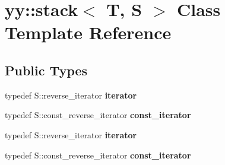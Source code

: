 \hypertarget{classyy_1_1stack}{}\section{yy\+:\+:stack$<$ T, S $>$ Class Template Reference}
\label{classyy_1_1stack}
\subsection*{Public Types}
\begin{DoxyCompactItemize}
\item 
\hypertarget{classyy_1_1stack_a959921144f243952520a2178121cbe6f}{}typedef S\+::reverse\+\_\+iterator {\bfseries iterator}\label{classyy_1_1stack_a959921144f243952520a2178121cbe6f}

\item 
\hypertarget{classyy_1_1stack_a0cab3a74b0947ce6de68c3520b9229ab}{}typedef S\+::const\+\_\+reverse\+\_\+iterator {\bfseries const\+\_\+iterator}\label{classyy_1_1stack_a0cab3a74b0947ce6de68c3520b9229ab}

\item 
\hypertarget{classyy_1_1stack_a959921144f243952520a2178121cbe6f}{}typedef S\+::reverse\+\_\+iterator {\bfseries iterator}\label{classyy_1_1stack_a959921144f243952520a2178121cbe6f}

\item 
\hypertarget{classyy_1_1stack_a0cab3a74b0947ce6de68c3520b9229ab}{}typedef S\+::const\+\_\+reverse\+\_\+iterator {\bfseries const\+\_\+iterator}\label{classyy_1_1stack_a0cab3a74b0947ce6de68c3520b9229ab}

\end{DoxyCompactItemize}
